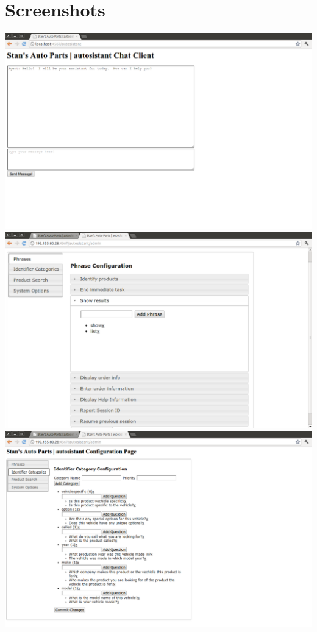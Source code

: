 \documentclass[11pt, titlepage]{article}
\begin{document}
\section{Screenshots}
\includegraphics[scale=0.35]{autosistantguichat.png}
\includegraphics[scale=0.35]{autosistantgui00.png}
\includegraphics[scale=0.35]{autosistantgui01.png}
\end{document}
